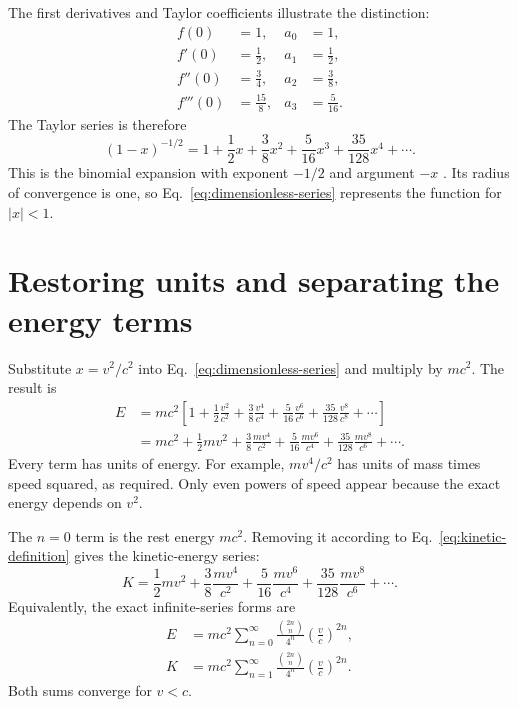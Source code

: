 \documentclass[12pt]{article}
\begin{document}
The first derivatives and Taylor coefficients illustrate the distinction:
\begin{align*}
  f(0)&=1, & a_0&=1, \\
  f'(0)&=\frac{1}{2}, & a_1&=\frac{1}{2}, \\
  f''(0)&=\frac{3}{4}, & a_2&=\frac{3}{8}, \\
  f'''(0)&=\frac{15}{8}, & a_3&=\frac{5}{16}.
\end{align*}
The Taylor series is therefore
\begin{equation}
  (1-x)^{-1/2}
  =1+\frac{1}{2}x+\frac{3}{8}x^2+\frac{5}{16}x^3
   +\frac{35}{128}x^4+\cdots.
  \label{eq:dimensionless-series}
\end{equation}
This is the binomial expansion with exponent $-1/2$ and argument $-x$ \cite{DLMF}. Its radius of convergence is one, so Eq.~\eqref{eq:dimensionless-series} represents the function for $|x|<1$.

\section{Restoring units and separating the energy terms}

Substitute $x=v^2/c^2$ into Eq.~\eqref{eq:dimensionless-series} and multiply by $mc^2$. The result is
\begin{align}
  E
  &=mc^2\left[
    1+\frac{1}{2}\frac{v^2}{c^2}
      +\frac{3}{8}\frac{v^4}{c^4}
      +\frac{5}{16}\frac{v^6}{c^6}
      +\frac{35}{128}\frac{v^8}{c^8}+\cdots
    \right] \\
  &=mc^2+\frac{1}{2}mv^2
      +\frac{3}{8}\frac{mv^4}{c^2}
      +\frac{5}{16}\frac{mv^6}{c^4}
      +\frac{35}{128}\frac{mv^8}{c^6}+\cdots.
  \label{eq:energy-series}
\end{align}
Every term has units of energy. For example, $mv^4/c^2$ has units of mass times speed squared, as required. Only even powers of speed appear because the exact energy depends on $v^2$.

The $n=0$ term is the rest energy $mc^2$. Removing it according to Eq.~\eqref{eq:kinetic-definition} gives the kinetic-energy series:
\begin{equation}
  K=\frac{1}{2}mv^2
      +\frac{3}{8}\frac{mv^4}{c^2}
      +\frac{5}{16}\frac{mv^6}{c^4}
      +\frac{35}{128}\frac{mv^8}{c^6}+\cdots.
  \label{eq:kinetic-series}
\end{equation}
Equivalently, the exact infinite-series forms are
\begin{align}
  E&=mc^2\sum_{n=0}^{\infty}
       \frac{\binom{2n}{n}}{4^n}\left(\frac{v}{c}\right)^{2n},
       \label{eq:energy-sum}\\
  K&=mc^2\sum_{n=1}^{\infty}
       \frac{\binom{2n}{n}}{4^n}\left(\frac{v}{c}\right)^{2n}.
       \label{eq:kinetic-sum}
\end{align}
Both sums converge for $v<c$.
\end{document}
